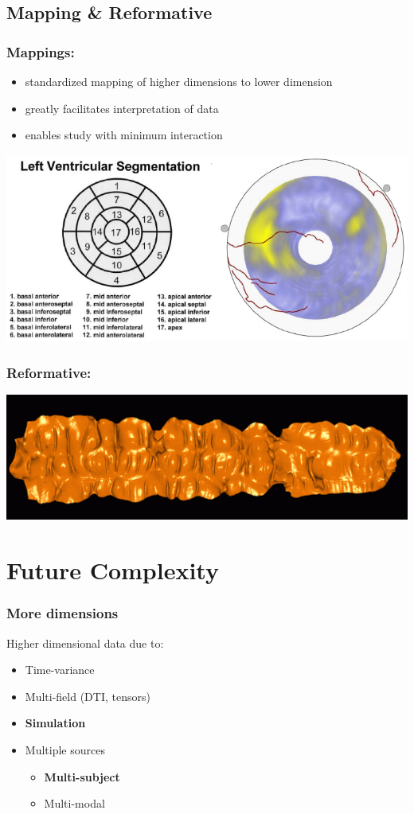 \documentclass{beamer}
\begin{document}
\subsection{Mapping \& Reformative}
\begin{frame}
	\frametitle{Mappings:}
	\begin{itemize}
		\item standardized mapping of higher dimensions to lower dimension
		\item greatly facilitates interpretation of data
		\item enables study with minimum interaction
	\end{itemize}
	\includegraphics[width=\textwidth]{images/heart}
\end{frame}

\begin{frame}
	\frametitle{Reformative:} %
	\includegraphics[width=\textwidth]{images/colon}
\end{frame}

\section{Future Complexity}
\begin{frame}
	\frametitle{More dimensions}
	Higher dimensional data due to:
	\begin{itemize}
		\item Time-variance
		\item Multi-field (DTI, tensors)
		\item \textbf{Simulation}
		\item Multiple sources
			\begin{itemize}
				\item \textbf{Multi-subject}
				\item Multi-modal
			\end{itemize}
	\end{itemize}
\end{frame}
\end{document}
